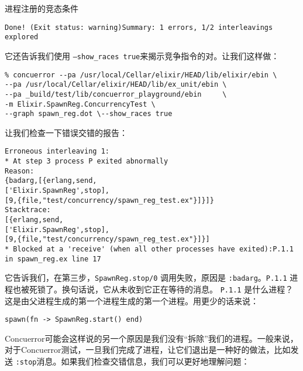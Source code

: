 \begin{example}{进程注册的竞态条件}
\begin{code}{}
\begin{verbatim}
Done! (Exit status: warning)Summary: 1 errors, 1/2 interleavings explored
\end{verbatim}
\end{code}

它还告诉我们使用 \texttt{--show\_races true}来揭示竞争指令的对。让我们这样做：

\begin{code}{}
\begin{verbatim}
% concuerror --pa /usr/local/Cellar/elixir/HEAD/lib/elixir/ebin \
--pa /usr/local/Cellar/elixir/HEAD/lib/ex_unit/ebin \
--pa _build/test/lib/concuerror_playground/ebin     \
-m Elixir.SpawnReg.ConcurrencyTest \
--graph spawn_reg.dot \--show_races true
\end{verbatim}
\end{code}

让我们检查一下错误交错的报告：

\begin{code}{}
\begin{verbatim}
Erroneous interleaving 1:
* At step 3 process P exited abnormally
Reason:
{badarg,[{erlang,send,
['Elixir.SpawnReg',stop],
[9,{file,"test/concurrency/spawn_reg_test.ex"}]}]}
Stacktrace:
[{erlang,send,
['Elixir.SpawnReg',stop],
[9,{file,"test/concurrency/spawn_reg_test.ex"}]}]
* Blocked at a 'receive' (when all other processes have exited):P.1.1 in spawn_reg.ex line 17
\end{verbatim}
\end{code}

它告诉我们，在第三步，\texttt{SpawnReg.stop/0}
调用失败，原因是
\texttt{:badarg}。\texttt{P.1.1}
进程也被死锁了。换句话说，它从未收到它正在等待的消息。
\texttt{P.1.1}
是什么进程？这是由父进程生成的第一个进程生成的第一个进程。用更少的话来说：

\begin{code}{}
\begin{verbatim}
spawn(fn -> SpawnReg.start() end)
\end{verbatim}
\end{code}

Concuerror可能会这样说的另一个原因是我们没有``拆除''我们的进程。一般来说，对于Concuerror测试，一旦我们完成了进程，让它们退出是一种好的做法，比如发送
\texttt{:stop}消息。如果我们检查交错信息，我们可以更好地理解问题：


\end{example}
